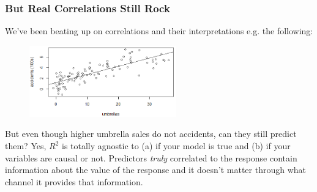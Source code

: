 \documentclass[handout]{beamer}
\begin{document}
\begin{frame}\frametitle{But Real Correlations Still Rock}

We've been beating up on correlations and their interpretations e.g. the following:

\begin{figure}
\centering
\includegraphics[width=2.5in]{umbrellas_car_accidents.png}
\end{figure}
\pause

But even though higher umbrella sales do not  accidents, can they still predict them? \pause Yes, $R^2$ is totally agnostic to (a) if your model is true and \pause (b) if your variables are causal or not. Predictors \textit{truly} correlated to the response contain information about the value of the response and it doesn't matter through what channel it provides that information. \pause
	
\end{frame}


\begin{frame}\frametitle{}

	
\end{frame}
\end{document}
